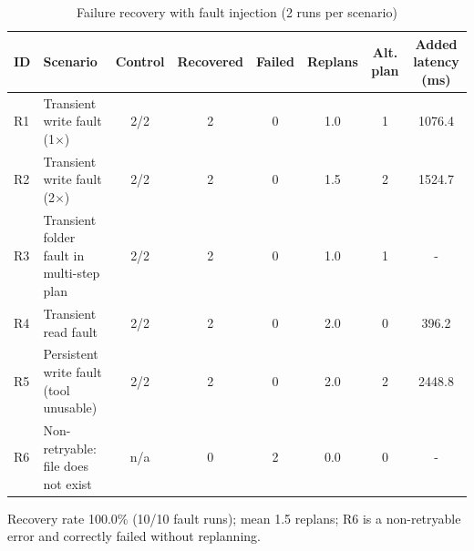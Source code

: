 \begin{table}[htbp]
\caption{Failure recovery with fault injection (2 runs per scenario)}
\label{tab:tableXI_recovery}
\centering
\begin{tabular}{llcccccc}
\hline
\textbf{ID} & \textbf{Scenario} & \textbf{Control} & \textbf{Recovered} & \textbf{Failed} & \textbf{Replans} & \textbf{Alt. plan} & \textbf{Added latency (ms)} \\
\hline
R1 & Transient write fault (1$\times$) & 2/2 & 2 & 0 & 1.0 & 1 & 1076.4 \\
R2 & Transient write fault (2$\times$) & 2/2 & 2 & 0 & 1.5 & 2 & 1524.7 \\
R3 & Transient folder fault in multi-step plan & 2/2 & 2 & 0 & 1.0 & 1 & - \\
R4 & Transient read fault & 2/2 & 2 & 0 & 2.0 & 0 & 396.2 \\
R5 & Persistent write fault (tool unusable) & 2/2 & 2 & 0 & 2.0 & 2 & 2448.8 \\
R6 & Non-retryable: file does not exist & n/a & 0 & 2 & 0.0 & 0 & - \\
\hline
\end{tabular}
\vspace{2pt}\footnotesize Recovery rate 100.0\% (10/10 fault runs); mean 1.5 replans; R6 is a non-retryable error and correctly failed without replanning.
\end{table}
